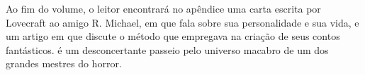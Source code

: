 Ao fim do volume, o leitor encontrará no apêndice uma carta escrita por
Lovecraft ao amigo R. Michael, em que fala sobre sua personalidade e sua vida, e um artigo em que discute o método que empregava na criação de seus contos fantásticos. {} é um desconcertante passeio pelo universo macabro de um dos grandes mestres do horror.

\vfill

\hspace*{-.4cm}\begin{minipage}[c]{.5\linewidth}
\small{
{}}
\end{minipage}

\pagebreak


